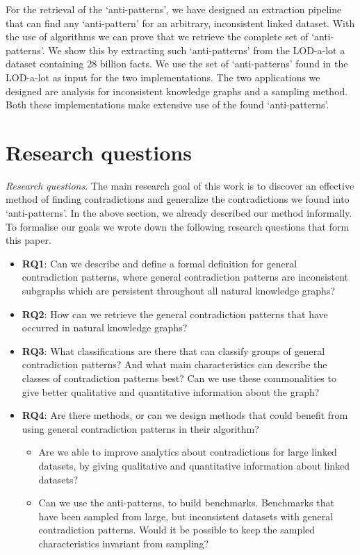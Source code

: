 \documentclass[11pt,letterpaper ,oneside ]{book}
\begin{document}
	For the retrieval of the `anti-patterns', we have designed an extraction pipeline that can find any `anti-pattern' for an arbitrary, inconsistent linked dataset. With the use of algorithms we can prove that we retrieve the complete set of `anti-patterns'. We show this by extracting such `anti-patterns' from the LOD-a-lot\cite{JavierD:2017} a dataset containing 28 billion facts. We use the set of `anti-patterns' found in the LOD-a-lot as input for the two implementations. The two applications we designed are analysis for inconsistent knowledge graphs and a sampling method. Both these implementations make extensive use of the found `anti-patterns'. 
	
	\section{Research questions}
	\textit{Research questions}. The main research goal of this work is to discover an effective method of finding contradictions and generalize the contradictions we found into `anti-patterns'. In the above section, we already described our method informally. To formalise our goals we wrote down the following research questions that form this paper.
	
	\begin{itemize}
		\item \textbf{RQ1}: Can we describe and define a formal definition for general contradiction patterns, where general contradiction patterns are inconsistent subgraphs which are persistent throughout all natural knowledge graphs?
		\item \textbf{RQ2}: How can we retrieve the general contradiction patterns that have occurred in natural knowledge graphs? 
		\item \textbf{RQ3}: What classifications are there that can classify groups of general contradiction patterns? And what main characteristics can describe the classes of contradiction patterns best? Can we use these commonalities to give better qualitative and quantitative information about the graph?
		\item \textbf{RQ4}: Are there methods, or can we design methods that could benefit from using general contradiction patterns in their algorithm? 
		\begin{itemize}
			\item Are we able to improve analytics about contradictions for large linked datasets, by giving qualitative and quantitative information about linked datasets?
			\item Can we use the anti-patterns, to build benchmarks. Benchmarks that have been sampled from large, but inconsistent datasets with general contradiction patterns. Would it be possible to keep the sampled characteristics invariant from sampling?
		\end{itemize}
	\end{itemize}
	
\end{document}
